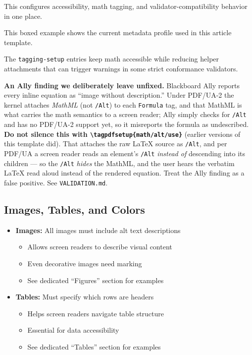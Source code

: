 \documentclass{article}
\begin{document}
\bigskip

\noindent This configures accessibility, math tagging, and validator-compatibility behavior in one place.

\noindent This boxed example shows the current metadata profile used in this article template.

\noindent The \texttt{tagging-setup} entries keep math accessible while reducing helper attachments that can trigger warnings in some strict conformance validators.

\medskip

\noindent \textbf{An Ally finding we deliberately leave unfixed.} Blackboard Ally reports every inline equation as ``image without description.'' Under PDF/UA-2 the kernel attaches \emph{MathML} (not \texttt{/Alt}) to each \texttt{Formula} tag, and that MathML is what carries the math semantics to a screen reader; Ally simply checks for \texttt{/Alt} and has no PDF/UA-2 support yet, so it misreports the formula as undescribed. \textbf{Do not silence this with \texttt{\textbackslash tagpdfsetup\{math/alt/use\}}} (earlier versions of this template did). That attaches the raw \LaTeX{} source as \texttt{/Alt}, and per PDF/UA a screen reader reads an element's \texttt{/Alt} \emph{instead of} descending into its children --- so the \texttt{/Alt} \emph{hides} the MathML, and the user hears the verbatim \LaTeX{} read aloud instead of the rendered equation. Treat the Ally finding as a false positive. See \texttt{VALIDATION.md}.

\subsection{Images, Tables, and Colors}

\begin{itemize}
\item \textbf{Images:} All images must include alt text descriptions
  \begin{itemize}
  \item Allows screen readers to describe visual content
  \item Even decorative images need marking
  \item See dedicated ``Figures'' section for examples
  \end{itemize}

\bigskip

\item \textbf{Tables:} Must specify which rows are headers
  \begin{itemize}
  \item Helps screen readers navigate table structure
  \item Essential for data accessibility
  \item See dedicated ``Tables'' section for examples
  \end{itemize}
\end{itemize}
\end{document}
